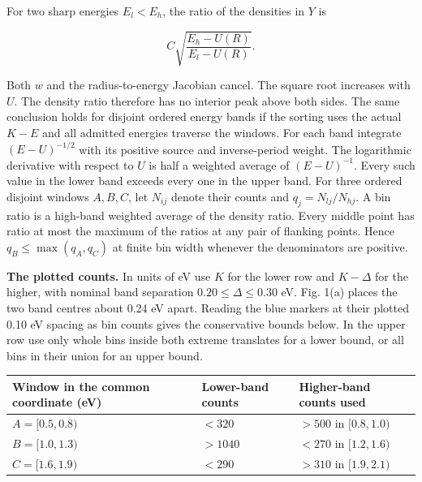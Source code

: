\documentclass[11pt,a4paper]{article}
\begin{document}
For two sharp energies \(E_l<E_h\), the ratio of the densities in \(Y\)
is

\[
                 C\sqrt{\frac{E_h-U(R)}{E_l-U(R)}} .
\]

Both \(w\) and the radius-to-energy Jacobian cancel. The square root
increases with \(U\). The density ratio therefore has no interior peak
above both sides. The same conclusion holds for disjoint ordered energy
bands if the sorting uses the actual \(K-E\) and all admitted energies
traverse the windows. For each band integrate \((E-U)^{-1/2}\) with its
positive source and inverse-period weight. The logarithmic derivative
with respect to \(U\) is half a weighted average of \((E-U)^{-1}\).
Every such value in the lower band exceeds every one in the upper band.
For three ordered disjoint windows \(A,B,C\), let \(N_{ij}\) denote
their counts and \(q_j=N_{lj}/N_{hj}\). A bin ratio is a high-band
weighted average of the density ratio. Every middle point has ratio at
most the maximum of the ratios at any pair of flanking points. Hence
\(q_B\le\max(q_A,q_C)\) at finite bin width whenever the denominators
are positive.

\textbf{The plotted counts.} In units of eV use \(K\) for the lower row
and \(K-\Delta\) for the higher, with nominal band separation
\(0.20\le\Delta\le0.30\) eV. Fig. 1(a) places the two band centres about
0.24 eV apart. Reading the blue markers at their plotted 0.10 eV spacing
as bin counts gives the conservative bounds below. In the upper row use
only whole bins inside both extreme translates for a lower bound, or all
bins in their union for an upper bound.

\begin{longtable}[]{@{}
  >{\raggedright\arraybackslash}p{}
  >{\raggedleft\arraybackslash}p{}
  >{\raggedleft\arraybackslash}p{}@{}}
\toprule\noalign{}
\begin{minipage}[b]{\linewidth}\raggedright
Window in the common coordinate (eV)
\end{minipage} & \begin{minipage}[b]{\linewidth}\raggedleft
Lower-band counts
\end{minipage} & \begin{minipage}[b]{\linewidth}\raggedleft
Higher-band counts used
\end{minipage} \\
\midrule\noalign{}
\endhead
\bottomrule\noalign{}
\endlastfoot
\(A=[0.5,0.8)\) & \(<320\) & \(>500\) in \([0.8,1.0)\) \\
\(B=[1.0,1.3)\) & \(>1040\) & \(<270\) in \([1.2,1.6)\) \\
\(C=[1.6,1.9)\) & \(<290\) & \(>310\) in \([1.9,2.1)\) \\
\end{longtable}
\end{document}
